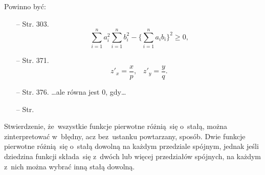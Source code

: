 \documentclass[a4paper,11pt]{article}
\begin{document}




\vspace{\spaceTwo} \vspace{\spaceThree}








Powinno być:
\begin{itemize}
\item[--] Str. 303.
$$\sum_{ i = 1 }^{ n } a_{ i }^{2} \sum_{ i = 1 }^{ n } b_{ i }^{ 2 } - \{ \sum_{ i = 1 }^{ n } a_{ i } b_{ i } \}^{ 2 } \geq 0 \textrm{,}$$
\item[--] Str. 371.
  $$z'_{ x } = \frac{ x }{ p } \textrm{,} \quad z'_{ y } = \frac{ y }{
    q } \textrm{.}$$
\item[--] Str. 376. \ldots ale równa jest 0, gdy\ldots
\item[--] Str.
\end{itemize}

\vspace{\spaceTwo}










\start {} Stwierdzenie, że~wszystkie funkcje pierwotne różnią~się
o~stałą, można zinterpretować w~błędny, acz bez~ustanku powtarzany,
sposób. Dwie funkcje pierwotne różnią~się o~stałą dowolną na każdym
przedziale spójnym, jednak jeśli dziedzina funkcji składa~się z~dwóch
lub więcej przedziałów spójnych, na każdym z~nich można wybrać inną
stałą dowolną.
\end{document}
